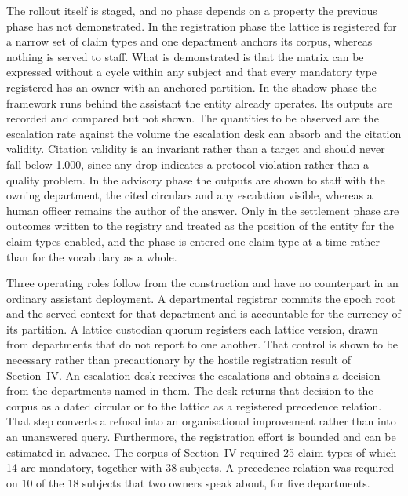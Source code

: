 \documentclass[journal]{IEEEtran}
\begin{document}
The rollout itself is staged, and no phase depends on a property the previous phase has not demonstrated. In the registration phase the lattice is registered for a narrow set of claim types and one department anchors its corpus, whereas nothing is served to staff. What is demonstrated is that the matrix can be expressed without a cycle within any subject and that every mandatory type registered has an owner with an anchored partition. In the shadow phase the framework runs behind the assistant the entity already operates. Its outputs are recorded and compared but not shown. The quantities to be observed are the escalation rate against the volume the escalation desk can absorb and the citation validity. Citation validity is an invariant rather than a target and should never fall below 1.000, since any drop indicates a protocol violation rather than a quality problem. In the advisory phase the outputs are shown to staff with the owning department, the cited circulars and any escalation visible, whereas a human officer remains the author of the answer. Only in the settlement phase are outcomes written to the registry and treated as the position of the entity for the claim types enabled, and the phase is entered one claim type at a time rather than for the vocabulary as a whole.

Three operating roles follow from the construction and have no counterpart in an ordinary assistant deployment. A departmental registrar commits the epoch root and the served context for that department and is accountable for the currency of its partition. A lattice custodian quorum registers each lattice version, drawn from departments that do not report to one another. That control is shown to be necessary rather than precautionary by the hostile registration result of Section~IV. An escalation desk receives the escalations and obtains a decision from the departments named in them. The desk returns that decision to the corpus as a dated circular or to the lattice as a registered precedence relation. That step converts a refusal into an organisational improvement rather than into an unanswered query. Furthermore, the registration effort is bounded and can be estimated in advance. The corpus of Section~IV required 25 claim types of which 14 are mandatory, together with 38 subjects. A precedence relation was required on 10 of the 18 subjects that two owners speak about, for five departments.
\end{document}

